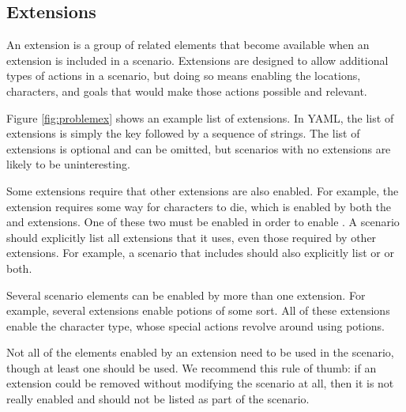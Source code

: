 \documentclass{nilreport}
\begin{document}
\newpage

\subsection{Extensions} \label{sec:extensions}

An extension is a group of related elements that become available when an extension is included in a scenario. Extensions are designed to allow additional types of actions in a scenario, but doing so means enabling the locations, characters, and goals that would make those actions possible and relevant.

Figure \ref{fig:problemex} shows an example list of extensions. In YAML, the list of extensions is simply the key  followed by a sequence of strings. The list of extensions is optional and can be omitted, but scenarios with no extensions are likely to be uninteresting.

Some extensions require that other extensions are also enabled. For example, the  extension requires some way for characters to die, which is enabled by both the  and  extensions. One of these two must be enabled in order to enable . A scenario should explicitly list all extensions that it uses, even those required by other extensions. For example, a scenario that includes  should also explicitly list  or  or both.

Several scenario elements can be enabled by more than one extension. For example, several extensions enable potions of some sort. All of these extensions enable the  character type, whose special actions revolve around using potions.

Not all of the elements enabled by an extension need to be used in the scenario, though at least one should be used. We recommend this rule of thumb: if an extension could be removed without modifying the scenario at all, then it is not really enabled and should not be listed as part of the scenario.

\end{document}
